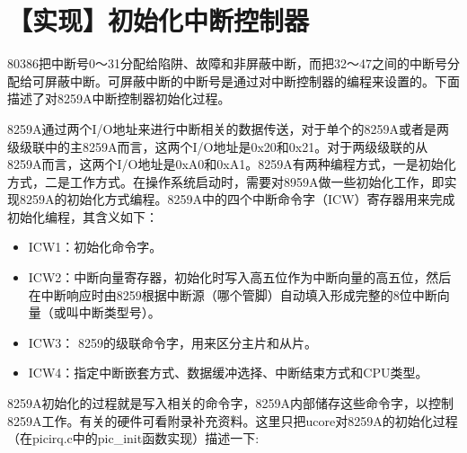 \section{【实现】初始化中断控制器}\label{ux5b9eux73b0ux521dux59cbux5316ux4e2dux65adux63a7ux5236ux5668}

80386把中断号0～31分配给陷阱、故障和非屏蔽中断，而把32～47之间的中断号分配给可屏蔽中断。可屏蔽中断的中断号是通过对中断控制器的编程来设置的。下面描述了对8259A中断控制器初始化过程。

8259A通过两个I/O地址来进行中断相关的数据传送，对于单个的8259A或者是两级级联中的主8259A而言，这两个I/O地址是0x20和0x21。对于两级级联的从8259A而言，这两个I/O地址是0xA0和0xA1。8259A有两种编程方式，一是初始化方式，二是工作方式。在操作系统启动时，需要对8959A做一些初始化工作，即实现8259A的初始化方式编程。8259A中的四个中断命令字（ICW）寄存器用来完成初始化编程，其含义如下：

\begin{itemize}
\tightlist
\item
  ICW1：初始化命令字。
\item
  ICW2：中断向量寄存器，初始化时写入高五位作为中断向量的高五位，然后在中断响应时由8259根据中断源（哪个管脚）自动填入形成完整的8位中断向量（或叫中断类型号）。
\item
  ICW3： 8259的级联命令字，用来区分主片和从片。
\item
  ICW4：指定中断嵌套方式、数据缓冲选择、中断结束方式和CPU类型。
\end{itemize}

8259A初始化的过程就是写入相关的命令字，8259A内部储存这些命令字，以控制8259A工作。有关的硬件可看附录补充资料。这里只把ucore对8259A的初始化过程（在picirq.c中的pic\_init函数实现）描述一下:

